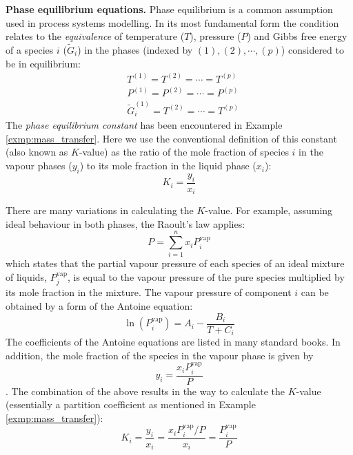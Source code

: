 \documentclass[a4paper,11pt]{article}
\theoremstyle{definition}
\begin{document}
\textbf{Phase equilibrium equations.}
Phase equilibrium is a common assumption used in process systems modelling. In its
most fundamental form the condition relates to the \emph{equivalence} of temperature ($T$), pressure ($P$) and 
Gibbs free energy of a species $i$ ($\tilde{G}_i$) in the phases (indexed by $(1), (2), \cdots, (p)$) considered to be in equilibrium:
\begin{align}
	&T^{(1)} = T^{(2)} = \cdots = T^{(p)} \\
	&P^{(1)} = P^{(2)} = \cdots = P^{(p)} \\
	&\tilde{G}_i^{(1)} = T^{(2)} = \cdots = T^{(p)}
\end{align}
\noindent The \emph{phase equilibrium constant} has been encountered in Example \ref{exmp:mass_transfer}. Here we use
the conventional definition of this constant (also known as $K$-value) as the ratio of the mole fraction of species $i$ in the vapour
phases ($y_i$) to its mole fraction in the liquid phase ($x_i$):
\begin{equation}
	K_i = \frac{y_i}{x_i}
\end{equation}

There are many variations in calculating the $K$-value. For example, assuming ideal behaviour in both phases, the Raoult's law applies:
\begin{equation}
P = \sum_{i=1}^n x_i P_i^{\textrm{vap}}
\end{equation}
\noindent which states that the partial vapour pressure of each species of an ideal mixture of liquids, $P_j^{\textrm{vap}}$, 
is equal to the vapour pressure of the pure species multiplied by its mole fraction in the mixture. 
The vapour pressure of component $i$ can be obtained by a form of the Antoine equation:
\begin{equation}
	\ln \left( P_i^{\textrm{vap}} \right) = A_i - \frac{B_i}{T + C_i}
\end{equation}
\noindent The coefficients of the Antoine equations are listed in many standard books. 
In addition, the mole fraction of the species in the vapour phase is given by
\begin{equation}
	y_i = \frac{x_i P_i^{\textrm{vap}}}{P}
\end{equation}
\noindent. The combination of the above results in the way to calculate the $K$-value 
(essentially a partition coefficient as mentioned in Example \ref{exmp:mass_transfer}):
\begin{equation}
	K_i = \frac{y_i}{x_i} = \frac{x_i P_i^{\textrm{vap}} / P}{x_i} = \frac{P_i^{\textrm{vap}}}{P} 
\end{equation}
\end{document}
